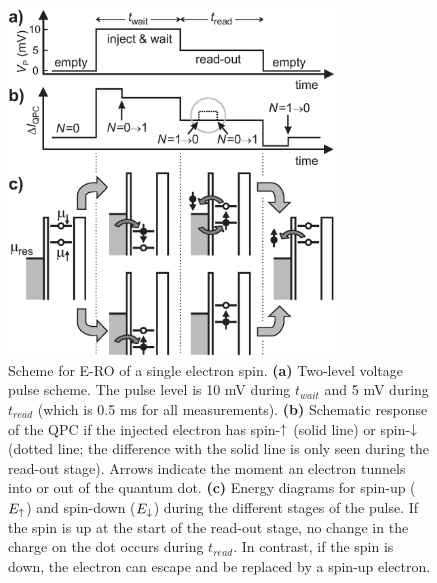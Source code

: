 \documentclass[rmp,twocolumn,aps]{revtex4}
\begin{document}
\begin{figure}[hbt]
\includegraphics[width=3.4in, clip=true]{hanson_fig15.eps}
\caption{Scheme for E-RO of a single electron spin. \textbf{(a)}
Two-level voltage pulse scheme. The pulse level is 10 mV during
$t_{wait}$ and 5 mV during $t_{read}$ (which is 0.5 ms for all
measurements). \textbf{(b)} Schematic response of the QPC if the
injected electron has spin-$\uparrow$ (solid line) or spin-$\downarrow$
(dotted line; the difference with the solid line is only seen
during the read-out stage). Arrows indicate the moment an electron
tunnels into or out of the quantum dot. \textbf{(c)} Energy
diagrams for spin-up ($E_{\uparrow}$) and spin-down ($E_{\downarrow}$) during
the different stages of the pulse. If the spin is up at the start
of the read-out stage, no change in the charge on the dot occurs
during $t_{read}$. In contrast, if the spin is down, the electron
can escape and be replaced by a spin-up electron.}
\label{Fig:EROpulse}
\end{figure}
\end{document}
